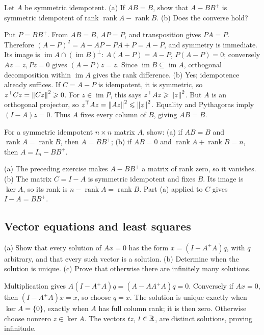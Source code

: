 \begin{problem}\label{ex:10:nested-projectors}
Let \(A\) be symmetric idempotent. (a) If \(AB=B\), show that
\(A-BB^+\) is symmetric idempotent of rank
\(\operatorname{rank}A-\operatorname{rank}B\).
(b) Does the converse hold?
\end{problem}
\begin{solution}
Put \(P=BB^+\). From \(AB=B\), \(AP=P\), and transposition gives
\(PA=P\). Therefore \((A-P)^2=A-AP-PA+P=A-P\), and symmetry is immediate.
Its image is \(\operatorname{im}A\cap(\operatorname{im}B)^\perp\):
\(A(A-P)=A-P\), \(P(A-P)=0\); conversely \(Az=z,Pz=0\) gives
\((A-P)z=z\). Since \(\operatorname{im}B\subseteq\operatorname{im}A\),
orthogonal decomposition within \(\operatorname{im}A\) gives the rank difference.
(b) Yes; idempotence already suffices. If \(C=A-P\) is idempotent, it is
symmetric, so \(z^\top Cz=\left\lVert Cz\right\rVert^2\geqslant0\).
For \(z\in\operatorname{im}P\), this says
\(z^\top Az\geqslant\left\lVert z\right\rVert^2\). But \(A\) is an orthogonal projector,
so \(z^\top Az=\left\lVert Az\right\rVert^2\leqslant\left\lVert z\right\rVert^2\).
Equality and Pythagoras imply \((I-A)z=0\). Thus \(A\) fixes every
column of \(B\), giving \(AB=B\).
\end{solution}

\begin{problem}\label{ex:10:identify-projector}
For a symmetric idempotent \(n\times n\) matrix \(A\), show:
(a) if \(AB=B\) and \(\operatorname{rank}A=\operatorname{rank}B\), then
\(A=BB^+\);
(b) if \(AB=0\) and \(\operatorname{rank}A+\operatorname{rank}B=n\),
then \(A=I_n-BB^+\).
\end{problem}
\begin{solution}
(a) The preceding exercise makes \(A-BB^+\) a matrix of rank zero,
so it vanishes.
(b) The matrix \(C=I-A\) is symmetric idempotent and fixes \(B\).
Its image is \(\ker A\), so its rank is
\(n-\operatorname{rank}A=\operatorname{rank}B\). Part (a) applied to
\(C\) gives \(I-A=BB^+\).
\end{solution}

\subsection*{Vector equations and least squares}

\begin{problem}\label{ex:10:homogeneous}
(a) Show that every solution of \(Ax=0\) has the form
\(x=(I-A^+A)q\), with \(q\) arbitrary, and that every such vector is
a solution. (b) Determine when the solution is unique.
(c) Prove that otherwise there are infinitely many solutions.
\end{problem}
\begin{solution}
Multiplication gives \(A(I-A^+A)q=(A-AA^+A)q=0\).
Conversely if \(Ax=0\), then \((I-A^+A)x=x\), so choose \(q=x\).
The solution is unique exactly when \(\ker A=\{0\}\), exactly when
\(A\) has full column rank; it is then zero. Otherwise choose nonzero
\(z\in\ker A\). The vectors \(tz\), \(t\in\mathbb R\), are distinct solutions,
proving infinitude.
\end{solution}

